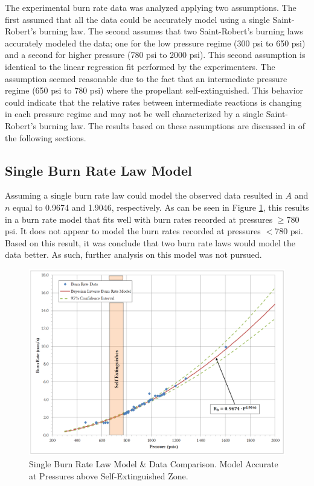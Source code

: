 \documentclass{article}
\begin{document}
The experimental burn rate data was analyzed applying two assumptions. The first assumed
that all the data could be accurately model using a single Saint-Robert's burning law. The second 
assumes that two Saint-Robert's burning laws accurately modeled the data; one for the low pressure 
regime (300 psi to 650 psi) and a second for higher pressure (780 psi to 2000 psi). This 
second assumption is identical to the linear regression fit performed by the experimenters. The assumption
seemed reasonable due to the fact that an intermediate 
pressure regime (650 psi to 780 psi) where the propellant self-extinguished. This behavior 
could indicate that the relative rates between intermediate reactions is changing in each 
pressure regime and may not be well characterized by a single Saint-Robert's burning law. 
The results based on these assumptions are discussed in of the following sections.

\subsection{Single Burn Rate Law Model} \label{singleRate}

Assuming a single burn rate law could model the observed data resulted in $A$ and $n$ equal 
to 0.9674 and 1.9046, respectively. As can be seen in Figure \ref{SingleBRfig}, this 
results in a burn rate model that fits well with burn rates recorded at pressures $\geq$780 psi.
It does not appear to model the burn rates recorded at pressures $<$780 psi. 
Based on this result, it was conclude that two burn rate laws would model the data better. 
As such, further analysis on this model was not pursued.

\begin{figure}[htb!]
\centering
\includegraphics[width=0.25\textheight]{Single_Burn_Rate_Results.png}
\caption{Single Burn Rate Law Model \& Data Comparison. Model Accurate at Pressures above Self-Extinguished Zone.}
\label{SingleBRfig}
\end{figure}
\end{document}
